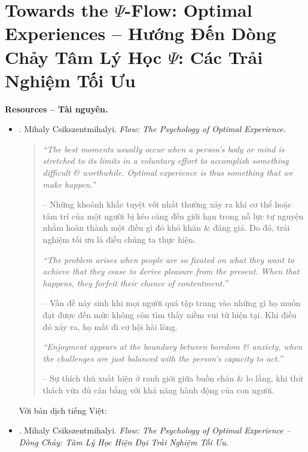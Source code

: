 \documentclass[12pt]{article}
\begin{document}
\section{Towards the $\Psi$-Flow: Optimal Experiences -- Hướng Đến Dòng Chảy Tâm Lý Học $\Psi$: Các Trải Nghiệm Tối Ưu}
\noindent\textbf{\textsf{Resources -- Tài nguyên.}}
\begin{itemize}
	\item \cite{Csikszentmihalyi_flow}. {\sc Mihaly Csikszentmihalyi}. {\it Flow: The Psychology of Optimal Experience}.
	\begin{quotation}
		{\it``The best moments usually occur when a person's body or mind is stretched to its limits in a voluntary effort to accomplish something difficult \& worthwhile. Optimal experience is thus something that we make happen.''}
		
		-- Những khoảnh khắc tuyệt vời nhất thường xảy ra khi cơ thể hoặc tâm trí của một người bị kéo căng đến giới hạn trong nỗ lực tự nguyện nhằm hoàn thành một điều gì đó khó khăn \& đáng giá. Do đó, trải nghiệm tối ưu là điều chúng ta thực hiện.
		
		{\it``The problem arises when people are so fixated on what they want to achieve that they cease to derive pleasure from the present. When that happens, they forfeit their chance of contentment.''}
		
		-- Vấn đề nảy sinh khi mọi người quá tập trung vào những gì họ muốn đạt được đến mức không còn tìm thấy niềm vui từ hiện tại. Khi điều đó xảy ra, họ mất đi cơ hội hài lòng.
		
		{\it``Enjoyment appears at the boundary between boredom \& anxiety, when the challenges are just balanced with the person's capacity to act.''}
		
		-- Sự thích thú xuất hiện ở ranh giới giữa buồn chán \& lo lắng, khi thử thách vừa đủ cân bằng với khả năng hành động của con người.		
	\end{quotation}
	Với bản dịch tiếng Việt:
	\item \cite{Csikszentmihalyi_flow_VN}. {\sc Mihaly Csikszentmihalyi}. {\it Flow: The Psychology of Optimal Experience -- Dòng Chảy: Tâm Lý Học Hiện Đại Trải Nghiệm Tối Ưu}.
\end{itemize}
\end{document}
